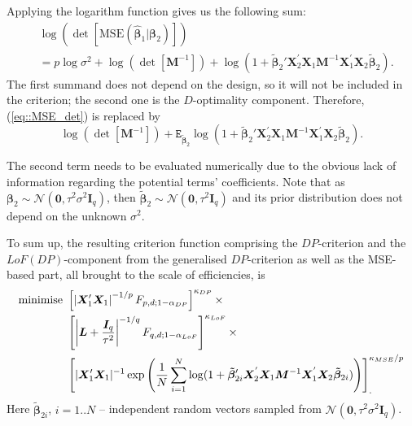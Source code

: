 Applying the logarithm function gives us the following sum:
\begin{align*}
&\log(\det[\mbox{MSE}(\bm{\hat{\beta}}_1|\bm{\beta}_2)])\\&=p\log\sigma^2+\log(\det[\bm{M}^{-1}])+\log(1+\bm{\tilde{\beta}}_2'\bm{X}_2^{'}\bm{X}_1\bm{M}^{-1}\bm{X}_1^{'}\bm{X}_2\bm{\tilde{\beta}}_2). 
\end{align*}
The first summand does not depend on the design, so it will not be included in the criterion; the second one is the $D$-optimality component. Therefore, (\ref{eq::MSE_det}) is replaced by
\begin{equation*}
\log(\det[\bm{M}^{-1}])+\mathtt{E}_{\bm{\tilde{\beta}}_2}\log(1+\bm{\tilde{\beta}}_2'\bm{X}_2^{'}\bm{X}_1\bm{M}^{-1}\bm{X}_1^{'}\bm{X}_2\bm{\tilde{\beta}}_2).
\end{equation*}

The second term needs to be evaluated numerically due to the obvious lack of information regarding the potential terms' coefficients. Note that as $\bm{\beta}_2 \sim \mathcal{N}(\bm{0},\tau^{2}\sigma^{2}\bm{I}_{q})$, then $\bm{\tilde{\beta}}_2 \sim \mathcal{N}(\bm{0},\tau^{2}\bm{I}_{q})$ and its prior distribution does not depend on the unknown $\sigma^2$.

To sum up, the resulting criterion function comprising the $DP$-criterion and the $LoF(DP)$-component from the generalised $DP$-criterion as well as the MSE-based part, all brought to the scale of efficiencies, is
\begin{align}
\label{eq::MSE_D}
\mbox{minimise }&\left[\left|\bm{X}'_{1}\bm{X}_{1}\right|^{-1/p}F_{p,d;1-\alpha_{DP}}\right]^{\kappa_{DP}} \times \notag \\ &\left[\left|\bm{L}+\frac{\bm{I}_{q}}{\tau^{2}}\right|^{-1/q}F_{q,d;1-\alpha_{LoF}}\right]^{\kappa_{LoF}}\times \notag\\ & \left[|\bm{X}'_{1}\bm{X}_{1}|^{-1}\exp\left(\frac{1}{N}\sum_{i=1}^{N}\log(1+\bm{\tilde{\beta}}_{2i}'\bm{X}_2^{'}\bm{X}_1\bm{M}^{-1}\bm{X}_1^{'}\bm{X}_2\bm{\tilde{\beta}}_{2i})\right)\right]_{.}^{\kappa_{MSE}/p}
\end{align}
Here $\bm{\tilde{\beta}}_{2i}$, $i=1..N$ -- independent random vectors sampled from $\mathcal{N}(\bm{0},\tau^{2}\sigma^{2}\bm{I}_{q})$.

